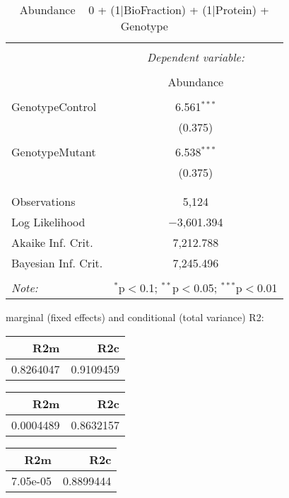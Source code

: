\documentclass[11pt]{report}
\begin{document}
\begin{table}[!htbp] \centering 
  \caption{Abundance ~ 0 + (1|BioFraction) + (1|Protein) + Genotype} 
  \label{} 
\begin{tabular}{@{\extracolsep{5pt}}lc} 
\\[-1.8ex]\hline 
\hline \\[-1.8ex] 
 & \multicolumn{1}{c}{\textit{Dependent variable:}} \\ 
\cline{2-2} 
\\[-1.8ex] & Abundance \\ 
\hline \\[-1.8ex] 
 GenotypeControl & 6.561$^{***}$ \\ 
  & (0.375) \\ 
  & \\ 
 GenotypeMutant & 6.538$^{***}$ \\ 
  & (0.375) \\ 
  & \\ 
\hline \\[-1.8ex] 
Observations & 5,124 \\ 
Log Likelihood & $-$3,601.394 \\ 
Akaike Inf. Crit. & 7,212.788 \\ 
Bayesian Inf. Crit. & 7,245.496 \\ 
\hline 
\hline \\[-1.8ex] 
\textit{Note:}  & \multicolumn{1}{r}{$^{*}$p$<$0.1; $^{**}$p$<$0.05; $^{***}$p$<$0.01} \\ 
\end{tabular} 
\end{table} 
marginal (fixed effects) and conditional (total variance) R2:

\begin{tabular}{r|r}
\hline
R2m & R2c\\
\hline
0.8264047 & 0.9109459\\
\hline
\end{tabular}

\begin{tabular}{r|r}
\hline
R2m & R2c\\
\hline
0.0004489 & 0.8632157\\
\hline
\end{tabular}

\begin{tabular}{r|r}
\hline
R2m & R2c\\
\hline
7.05e-05 & 0.8899444\\
\hline
\end{tabular}
\end{document}
